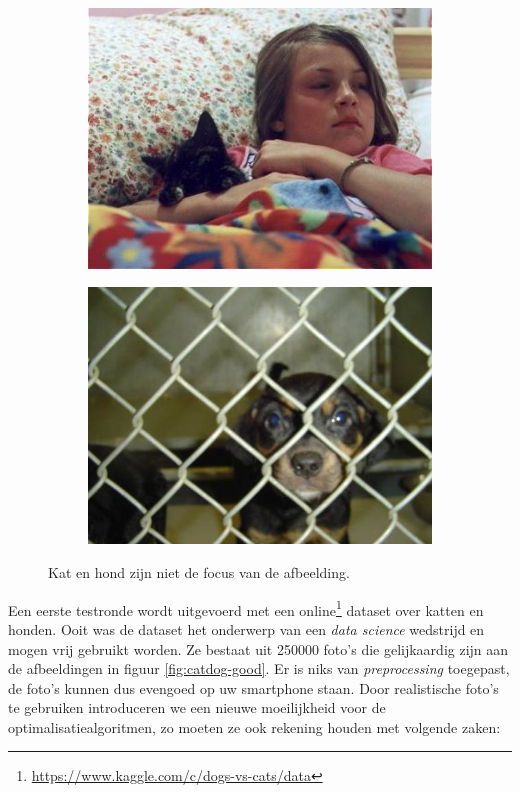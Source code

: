 \begin{figure}
    \begin{subfigure}{.5\textwidth}
        \centering
        \includegraphics[width=.8\linewidth]{img/bad_cat.jpg}
        \label{fig:cat-bad}
    \end{subfigure}%
    \begin{subfigure}{.5\textwidth}
        \centering
        \includegraphics[width=.8\linewidth]{img/bad_dog.jpg}
        \label{fig:dog-bad}
    \end{subfigure}
    \caption{Kat en hond zijn niet de focus van de afbeelding.}
    \label{fig:catdog-bad}
\end{figure}

Een eerste testronde wordt uitgevoerd met een online\footnote{\url{https://www.kaggle.com/c/dogs-vs-cats/data}} dataset over katten en honden. Ooit was de dataset het onderwerp van een \textit{data science} wedstrijd en mogen vrij gebruikt worden. Ze bestaat uit 250000 foto's die gelijkaardig zijn aan de afbeeldingen in figuur \ref{fig:catdog-good}. Er is niks van \textit{preprocessing} toegepast, de foto's kunnen dus evengoed op uw smartphone staan. Door realistische foto's te gebruiken introduceren we een nieuwe moeilijkheid voor de optimalisatiealgoritmen, zo moeten ze ook rekening houden met volgende zaken: 

